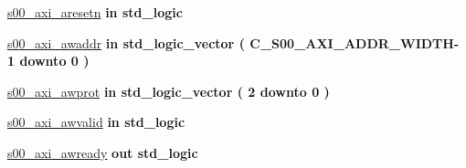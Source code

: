 \begin{DoxyCompactItemize}
\hyperlink{classUART__v1__0_a8249c106fbd80196dcad2666c9f0b3fc}{s00\+\_\+axi\+\_\+aresetn}  {\bfseries {\bfseries \textcolor{vhdlchar}{in}\textcolor{vhdlchar}{ }}} {\bfseries \textcolor{vhdlchar}{std\+\_\+logic}\textcolor{vhdlchar}{ }} 
\item 
\mbox{\label{classUART__v1__0_a9fe80d3cc7f862afb670536e4e05dbeb}} 
\hyperlink{classUART__v1__0_a9fe80d3cc7f862afb670536e4e05dbeb}{s00\+\_\+axi\+\_\+awaddr}  {\bfseries {\bfseries \textcolor{vhdlchar}{in}\textcolor{vhdlchar}{ }}} {\bfseries \textcolor{vhdlchar}{std\+\_\+logic\+\_\+vector}\textcolor{vhdlchar}{ }\textcolor{vhdlchar}{(}\textcolor{vhdlchar}{ }\textcolor{vhdlchar}{ }\textcolor{vhdlchar}{ }\textcolor{vhdlchar}{ }\textcolor{vhdlchar}{C\+\_\+\+S00\+\_\+\+A\+X\+I\+\_\+\+A\+D\+D\+R\+\_\+\+W\+I\+D\+TH}\textcolor{vhdlchar}{-\/}\textcolor{vhdlchar}{ } \textcolor{vhdldigit}{1} \textcolor{vhdlchar}{ }\textcolor{vhdlchar}{downto}\textcolor{vhdlchar}{ }\textcolor{vhdlchar}{ } \textcolor{vhdldigit}{0} \textcolor{vhdlchar}{ }\textcolor{vhdlchar}{)}\textcolor{vhdlchar}{ }} 
\item 
\mbox{\label{classUART__v1__0_a719659c1addef5432978cc949d9e10ed}} 
\hyperlink{classUART__v1__0_a719659c1addef5432978cc949d9e10ed}{s00\+\_\+axi\+\_\+awprot}  {\bfseries {\bfseries \textcolor{vhdlchar}{in}\textcolor{vhdlchar}{ }}} {\bfseries \textcolor{vhdlchar}{std\+\_\+logic\+\_\+vector}\textcolor{vhdlchar}{ }\textcolor{vhdlchar}{(}\textcolor{vhdlchar}{ }\textcolor{vhdlchar}{ } \textcolor{vhdldigit}{2} \textcolor{vhdlchar}{ }\textcolor{vhdlchar}{downto}\textcolor{vhdlchar}{ }\textcolor{vhdlchar}{ } \textcolor{vhdldigit}{0} \textcolor{vhdlchar}{ }\textcolor{vhdlchar}{)}\textcolor{vhdlchar}{ }} 
\item 
\mbox{\label{classUART__v1__0_a45aa02a72ae1a8389346d47173c60ed0}} 
\hyperlink{classUART__v1__0_a45aa02a72ae1a8389346d47173c60ed0}{s00\+\_\+axi\+\_\+awvalid}  {\bfseries {\bfseries \textcolor{vhdlchar}{in}\textcolor{vhdlchar}{ }}} {\bfseries \textcolor{vhdlchar}{std\+\_\+logic}\textcolor{vhdlchar}{ }} 
\item 
\mbox{\label{classUART__v1__0_ad0a1f71502d91a45dbc6c365f85c6566}} 
\hyperlink{classUART__v1__0_ad0a1f71502d91a45dbc6c365f85c6566}{s00\+\_\+axi\+\_\+awready}  {\bfseries {\bfseries \textcolor{vhdlchar}{out}\textcolor{vhdlchar}{ }}} {\bfseries \textcolor{vhdlchar}{std\+\_\+logic}\textcolor{vhdlchar}{ }} 

\end{DoxyCompactItemize}
